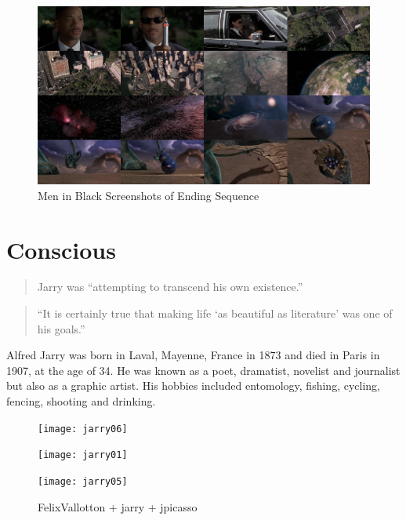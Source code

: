 \begin{figure}[htb] %
  \centering
  \includegraphics[width=\linewidth]{images/mib}
  \caption[Men in Black]{Men in Black Screenshots of Ending Sequence}
\label{fig:MIB}
\end{figure}

\section{Conscious}

\begin{quote}
  Jarry was ``attempting to transcend his own existence.'' \autocite{Hugill2012a}
\end{quote}

\begin{quote}
  ``It is certainly true that making life `as beautiful as literature' was one of his goals.'' \autocite{Hugill2012a}
\end{quote}

Alfred Jarry was born in Laval, Mayenne, France in 1873 and died in Paris in 1907, at the age of 34. He was known as a poet, dramatist, novelist and journalist but also as a graphic artist. His hobbies included entomology, fishing, cycling, fencing, shooting and drinking.

\begin{figure}[htb]
  \centering
  \begin{minipage}{.275\linewidth}
    \texttt{[image: jarry06]}
  \end{minipage}
  \hspace{.05\linewidth}
  \begin{minipage}{.275\linewidth}
    \texttt{[image: jarry01]}
  \end{minipage}
  \hspace{.05\linewidth}
  \begin{minipage}{.275\linewidth}
    \texttt{[image: jarry05]}
  \end{minipage}
  \caption[figures1--3]{FelixVallotton + jarry + jpicasso}
\label{img123}
\end{figure}

